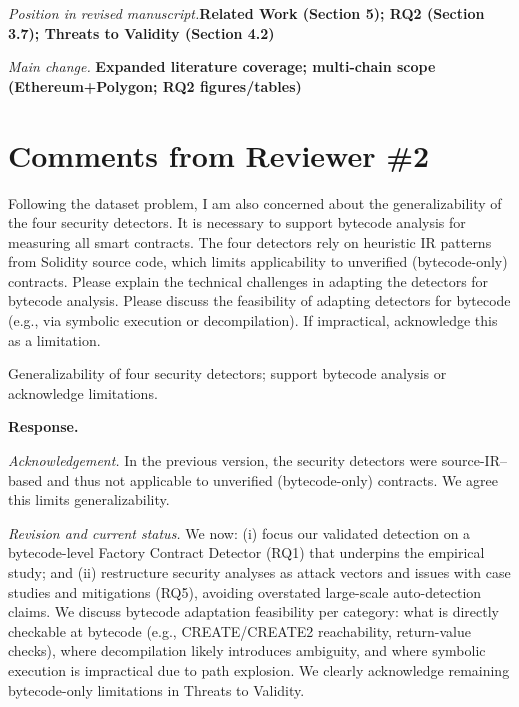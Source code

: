 \documentclass[acmsmall]{acmart}
\begin{document}
	\textit{Position in revised manuscript.}{\color{red}\textbf{Related Work (Section 5); RQ2 (Section 3.7); Threats to Validity (Section 4.2)}}

	\textit{Main change.}
	{\color{blue}\textbf{Expanded literature coverage; multi-chain scope (Ethereum+Polygon; RQ2 figures/tables)}}

	\newpage
	\section{Comments from Reviewer \#2}

	\begin{tcolorbox}
		[commentbox,title=Reviewer \#2 -- Comment 1] Following the dataset problem, I am also
		concerned about the generalizability of the four security detectors. It is necessary to support
		bytecode analysis for measuring all smart contracts. The four detectors rely on heuristic IR
		patterns from Solidity source code, which limits applicability to unverified (bytecode-only)
		contracts. Please explain the technical challenges in adapting the detectors for bytecode
		analysis. Please discuss the feasibility of adapting detectors for bytecode (e.g., via
		symbolic execution or decompilation). If impractical, acknowledge this as a limitation.
	\end{tcolorbox}

	\begin{tcolorbox}
		[commentbox,title=Reviewer \#2 -- Comment 2] Generalizability of four security detectors;
		support bytecode analysis or acknowledge limitations.
	\end{tcolorbox}

	\noindent
	\textbf{Response.}

	\textit{Acknowledgement.} In the previous version, the security detectors were source-IR–based
	and thus not applicable to unverified (bytecode-only) contracts. We agree this limits generalizability.

	\textit{Revision and current status.} We now: (i) focus our validated detection on a bytecode-level
	Factory Contract Detector (RQ1) that underpins the empirical study; and (ii) restructure
	security analyses as attack vectors and issues with case studies and mitigations (RQ5), avoiding
	overstated large-scale auto-detection claims. We discuss bytecode adaptation feasibility per
	category: what is directly checkable at bytecode (e.g., CREATE/CREATE2 reachability, return-value
	checks), where decompilation likely introduces ambiguity, and where symbolic execution is
	impractical due to path explosion. We clearly acknowledge remaining bytecode-only limitations in
	Threats to Validity.
\end{document}
